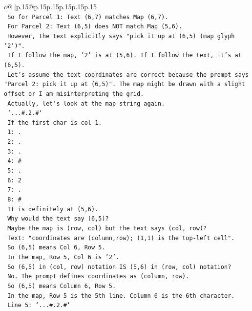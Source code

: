 \documentclass{article}
\begin{document}
{\begin{supertabular}{c@{$\;$}|p{.15\linewidth}@{}p{.15\linewidth}p{.15\linewidth}p{.15\linewidth}p{.15\linewidth}p{.15\linewidth}}
{{{\\ 
\texttt{       So for Parcel 1: Text (6,7) matches Map (6,7).} \\
\texttt{       For Parcel 2: Text (6,5) does NOT match Map (5,6).} \\
\texttt{       However, the text explicitly says "pick it up at (6,5) (map glyph '2')".} \\
\texttt{       If I follow the map, '2' is at (5,6). If I follow the text, it's at (6,5).} \\
\texttt{       Let's assume the text coordinates are correct because the prompt says "Parcel 2: pick it up at (6,5)". The map might be drawn with a slight offset or I am misinterpreting the grid.} \\
\texttt{       Actually, let's look at the map string again.} \\
\texttt{       `...\#.2.\#`} \\
\texttt{       If the first char is col 1.} \\
\texttt{       1: .} \\
\texttt{       2: .} \\
\texttt{       3: .} \\
\texttt{       4: \#} \\
\texttt{       5: .} \\
\texttt{       6: 2} \\
\texttt{       7: .} \\
\texttt{       8: \#} \\
\texttt{       It is definitely at (5,6).} \\
\texttt{       Why would the text say (6,5)?} \\
\texttt{       Maybe the map is (row, col) but the text says (col, row)?} \\
\texttt{       Text: "coordinates are (column,row); (1,1) is the top{-}left cell".} \\
\texttt{       So (6,5) means Col 6, Row 5.} \\
\texttt{       In the map, Row 5, Col 6 is '2'.} \\
\texttt{       So (6,5) in (col, row) notation IS (5,6) in (row, col) notation?} \\
\texttt{       No. The prompt defines coordinates as (column, row).} \\
\texttt{       So (6,5) means Column 6, Row 5.} \\
\texttt{       In the map, Row 5 is the 5th line. Column 6 is the 6th character.} \\
\texttt{       Line 5: `...\#.2.\#`} \\
}}}
\end{supertabular}}
\end{document}
